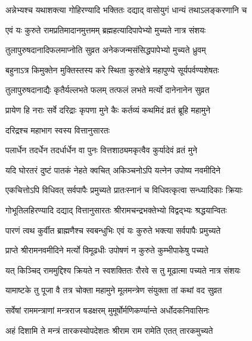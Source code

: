 \twolineshloka
{अन्नेभ्यश्च यथाशक्त्या गोहिरण्यादि भक्तितः}%
{दद्याद् वासोयुगं धान्यं तथाऽलङ्करणानि च}

\twolineshloka
{एवं यः कुरुते रामप्रतिमादानमुत्तमम्}%
{ब्रह्महत्यादिपापेभ्यो मुच्यते नात्र संशयः}

\twolineshloka
{तुलापुरुषदानादिफलमाप्नोति सुव्रत}%
{अनेकजन्मसंसिद्धपापेभ्यो मुच्यते ध्रुवम्}

\twolineshloka
{बहुनाऽत्र किमुक्तेन मुक्तिस्तस्य करे स्थिता}%
{कुरुक्षेत्रे महापुण्ये सूर्यपर्वण्यशेषतः}

\twolineshloka
{तुलापुरुषदानाद्यैः कृतैर्यल्लभते फलम्}
{तत्फलं लभते मर्त्यो दानेनानेन सुव्रत}%

\twolineshloka
{प्रायेण हि नराः सर्वे दरिद्राः कृपणा मुने}
{कैः कर्तव्यं कथमिदं व्रतं ब्रूहि महामुने}%

\onelineshloka
{दरिद्रश्च महाभाग स्वस्य वित्तानुसारतः}%

\twolineshloka
{पलार्धेन तदर्धेन तदर्धार्धेन वा पुनः}
{वित्तशाठ्यमकृत्वैव कुर्यादेवं व्रतं मुने}%

\twolineshloka
{यदि घोरतरं दुष्टं पातकं नेहते क्वचित्}
{अकिञ्चनोऽपि यत्नेन उपोष्य नवमीदिने}%

\twolineshloka
{एकचित्तोऽपि विधिवत् सर्वपापैः प्रमुच्यते}
{प्रातःस्नानं च विधिवत्कृत्वा सन्ध्यादिकाः क्रियाः}%

\twolineshloka
{गोभूतिलहिरण्यादि दद्याद् वित्तानुसारतः}
{श्रीरामचन्द्रभक्तेभ्यो विद्वद्भ्यः श्रद्धयान्वितः}%

\twolineshloka
{पारणं त्वथ कुर्वीत ब्राह्मणैश्च स्वबन्धुभिः}
{एवं यः कुरुते भक्त्या सर्वपापैः प्रमुच्यते}%

\twolineshloka
{प्राप्ते श्रीरामनवमीदिने मर्त्यो विमूढधीः}
{उपोषणं न कुरुते कुम्भीपाकेषु पच्यते}%

\twolineshloka
{यत् किञ्चिद् राममुद्दिश्य क्रियते न स्वशक्तितः}
{रौरवे स तु मूढात्मा पच्यते नात्र संशयः}%

\twolineshloka
{यामाष्टके तु पूजा वै तत्र चोक्ता महामुने}
{मूलमन्त्रेण संयुक्ता तां कथां वद सुव्रत}%

\twolineshloka
{सर्वेषां राममन्त्राणां मन्त्रराज षडक्षरम्} %
{मुमूर्षोर्मणिकर्ण्यान्ते अर्धोदकनिवासिनः}%

\twolineshloka
{अहं दिशामि ते मन्त्रं तारकस्योपदेशतः}
{श्रीराम राम रामेति एतत् तारकमुच्यते}%


